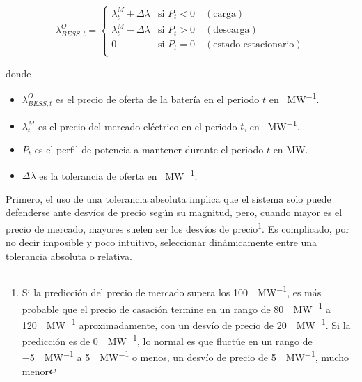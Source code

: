 \begin{equation}
  \label{eq:emisión-tolerancia}
  \lambda^{O}_{BESS, t} =
  \begin{cases}
    \lambda^{M}_{t} + \Delta \lambda & \text{si } P_{t} < 0 \quad (\text{carga})               \\
    \lambda^{M}_{t} - \Delta \lambda & \text{si } P_{t} > 0 \quad (\text{descarga})            \\
    0                                & \text{si } P_{t} = 0 \quad (\text{estado estacionario}) \\
  \end{cases}
\end{equation}

donde

\begin{itemize}

  \item \( \lambda^{O}_{BESS, t} \) es el precio de oferta de la batería en el periodo \( t \) en \si{\text{\euro}\per\mega\watt}.

  \item \( \lambda^{M}_{t} \) es el precio del mercado eléctrico en el periodo \( t \), en \si{\text{\euro}\per\mega\watt}.

  \item \( P_{t} \) es el perfil de potencia a mantener durante el periodo \( t \) en \si{\mega\watt}.

  \item \( \Delta \lambda \) es la tolerancia de oferta en \si{\text{\euro}\per\mega\watt}.

\end{itemize}

Primero, el uso de una tolerancia absoluta implica que el sistema solo puede defenderse ante desvíos de precio según su magnitud, pero, cuando mayor es el precio de mercado, mayores suelen ser los desvíos de precio\footnote{Si la predicción del precio de mercado supera los \SI{100}{\text{\euro}\per\mega\watt}, es más probable que el precio de casación termine en un rango de \SI{80}{\text{\euro}\per\mega\watt} a \SI{120}{\text{\euro}\per\mega\watt} aproximadamente, con un desvío de precio de \SI{20}{\text{\euro}\per\mega\watt}. Si la predicción es de \SI{0}{\text{\euro}\per\mega\watt}, lo normal es que fluctúe en un rango de \SI{-5}{\text{\euro}\per\mega\watt} a \SI{5}{\text{\euro}\per\mega\watt} o menos, un desvío de precio de \SI{5}{\text{\euro}\per\mega\watt}, mucho menor}. Es complicado, por no decir imposible y poco intuitivo, seleccionar dinámicamente entre una tolerancia absoluta o relativa.

